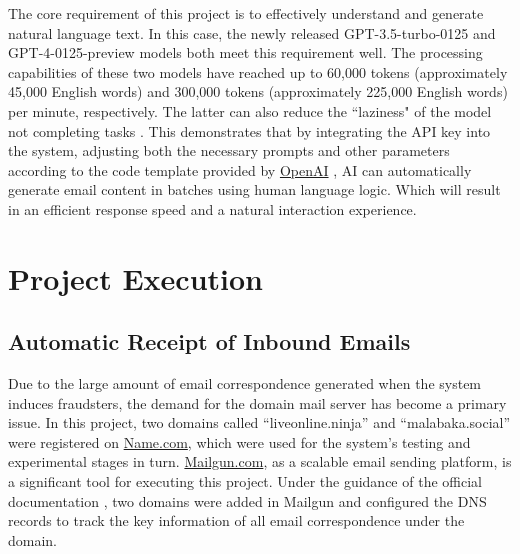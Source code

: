 \documentclass[ oneside,%
                    author={Cassie Qing Tang},
                    degree={BSc},
                     title={An Automated Response System for Disrupting Online Pet Scamming \\ },
                    subtitle={ }]{dissertation}
\begin{document}
The core requirement of this project is to effectively understand and generate natural language text. In this case, the newly released GPT-3.5-turbo-0125 and GPT-4-0125-preview models both meet this requirement well. The processing capabilities of these two models have reached up to 60,000 tokens (approximately 45,000 English words) and 300,000 tokens (approximately 225,000 English words) per minute, respectively. The latter can also reduce the ``laziness" of the model not completing tasks \cite{noauthor_openai_nodate}. This demonstrates that by integrating the API key into the system, adjusting both the necessary prompts and other parameters according to the code template provided by \href{https://openai.com/}{OpenAI} \cite{noauthor_openai_nodate}, AI can automatically generate email content in batches using human language logic. Which will result in an efficient response speed and a natural interaction experience.




\chapter{Project Execution}
\section{Automatic Receipt of Inbound Emails}
Due to the large amount of email correspondence generated when the system induces fraudsters, the demand for the domain mail server has become a primary issue. In this project, two domains called “liveonline.ninja” and “malabaka.social” were registered on \href{https://www.name.com}{Name.com}, which were used for the system's testing and experimental stages in turn. \href{https://www.mailgun.com}{Mailgun.com}, as a scalable email sending platform, is a significant tool for executing this project. Under the guidance of the official documentation \cite{noauthor_domain_nodate}, two domains were added in Mailgun and configured the DNS records to track the key information of all email correspondence under the domain.
\\
\end{document}
